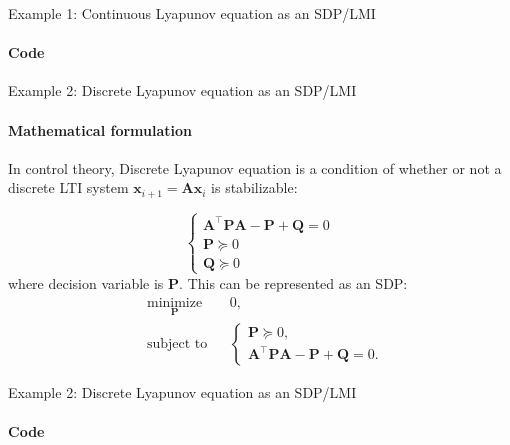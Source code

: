 \documentclass{beamer}
\begin{document}
\begin{frame}{Example 1: Continuous Lyapunov equation as an SDP/LMI}
\framesubtitle{Code}
\begin{flushleft}



\end{flushleft}
\end{frame}




\begin{frame}{Example 2: Discrete Lyapunov equation as an SDP/LMI}
\framesubtitle{Mathematical formulation}
\begin{flushleft}

In control theory, Discrete Lyapunov equation is a condition of whether or not a discrete LTI system $\mathbf{x}_{i+1} = \mathbf{A}\mathbf{x}_i$ is stabilizable:

\begin{equation}
    \begin{cases}
        \mathbf{A}^\top \mathbf{P}\mathbf{A} - \mathbf{P} + \mathbf{Q} = 0 \\
        \mathbf{P} \succeq 0 \\
        \mathbf{Q} \succeq 0 
    \end{cases}
\end{equation}
%
where decision variable is $\mathbf{P}$. This can be represented as an SDP:
%
\begin{equation}
\begin{aligned}
& \underset{\mathbf{P}}{\text{minimize}}
& & 0, \\
& \text{subject to}
& & \begin{cases}
    \mathbf{P} \succeq 0, \\
    \mathbf{A}^\top \mathbf{P}\mathbf{A} - \mathbf{P} + \mathbf{Q} = 0.
    \end{cases}
\end{aligned}
\end{equation}


\end{flushleft}
\end{frame}



\begin{frame}{Example 2: Discrete Lyapunov equation as an SDP/LMI}
\framesubtitle{Code}
\begin{flushleft}



\end{flushleft}
\end{frame}
\end{document}
